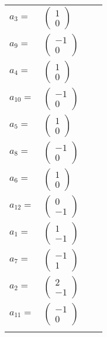 \documentclass[1p]{elsarticle_modified}
\theoremstyle{definition}
\begin{document}
\begin{tabular}{m{7pt} m{180pt} m{7pt} m{180pt} }
\flushright $a_{3}=$&$\begin{pmatrix}1\\0\end{pmatrix}$ \\
\flushright $a_{9}=$&$\begin{pmatrix}-1\\0\end{pmatrix}$ \\
\flushright $a_{4}=$&$\begin{pmatrix}1\\0\end{pmatrix}$ \\
\flushright $a_{10}=$&$\begin{pmatrix}-1\\0\end{pmatrix}$ \\
\flushright $a_{5}=$&$\begin{pmatrix}1\\0\end{pmatrix}$ \\
\flushright $a_{8}=$&$\begin{pmatrix}-1\\0\end{pmatrix}$ \\
\flushright $a_{6}=$&$\begin{pmatrix}1\\0\end{pmatrix}$ \\
\flushright $a_{12}=$&$\begin{pmatrix}0\\-1\end{pmatrix}$ \\
\flushright $a_{1}=$&$\begin{pmatrix}1\\-1\end{pmatrix}$ \\
\flushright $a_{7}=$&$\begin{pmatrix}-1\\1\end{pmatrix}$ \\
\flushright $a_{2}=$&$\begin{pmatrix}2\\-1\end{pmatrix}$ \\
\flushright $a_{11}=$&$\begin{pmatrix}-1\\0\end{pmatrix}$\\&\end{tabular}
\end{document}

